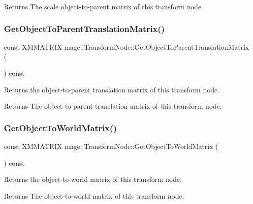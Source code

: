 \begin{DoxyReturn}{Returns}
The scale object-\/to-\/parent matrix of this transform node. 
\end{DoxyReturn}
\hypertarget{classmage_1_1_transform_node_ad548d659067b5aa6bb0d76c073850179}{}\label{classmage_1_1_transform_node_ad548d659067b5aa6bb0d76c073850179} 
\subsubsection{\texorpdfstring{Get\+Object\+To\+Parent\+Translation\+Matrix()}{GetObjectToParentTranslationMatrix()}}
{\footnotesize\ttfamily const X\+M\+M\+A\+T\+R\+IX mage\+::\+Transform\+Node\+::\+Get\+Object\+To\+Parent\+Translation\+Matrix (\begin{DoxyParamCaption}{ }\end{DoxyParamCaption}) const}

Returns the object-\/to-\/parent translation matrix of this transform node.

\begin{DoxyReturn}{Returns}
The object-\/to-\/parent translation matrix of this transform node. 
\end{DoxyReturn}
\hypertarget{classmage_1_1_transform_node_aa380b495bdf5ac30abe63c542175a60e}{}\label{classmage_1_1_transform_node_aa380b495bdf5ac30abe63c542175a60e} 
\subsubsection{\texorpdfstring{Get\+Object\+To\+World\+Matrix()}{GetObjectToWorldMatrix()}}
{\footnotesize\ttfamily const X\+M\+M\+A\+T\+R\+IX mage\+::\+Transform\+Node\+::\+Get\+Object\+To\+World\+Matrix (\begin{DoxyParamCaption}{ }\end{DoxyParamCaption}) const}

Returns the object-\/to-\/world matrix of this transform node.

\begin{DoxyReturn}{Returns}
The object-\/to-\/world matrix of this transform node. 
\end{DoxyReturn}
\hypertarget{classmage_1_1_transform_node_a4d209a7f35df862836c5e2f1badfd968}{}\label{classmage_1_1_transform_node_a4d209a7f35df862836c5e2f1badfd968} 
